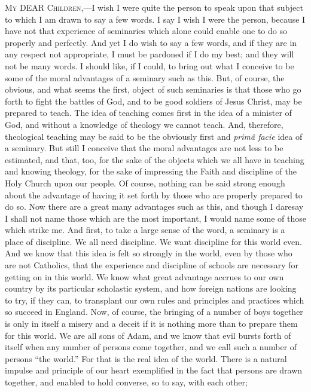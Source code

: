 M\textsc{y}
DEAR C\textsc{hildren},—I wish I
were quite the person to speak upon that subject to which I am drawn
to say a few words. I say I wish I were the person, because I have not
that experience of seminaries which alone could enable one to do so
properly and perfectly. And yet I do wish to say a few words, and if
they are in any respect not appropriate, I must be pardoned if I do my
best; and they will not be many words. I should like, if I could, to
bring out what I conceive to be some of the moral advantages of a
seminary such as this. But, of course, the obvious, and what seems the
first, object of such seminaries is that those who go forth to fight
the battles of God, and to be good soldiers of Jesus Christ, may be
prepared to teach. The idea of teaching comes first in the idea of a
minister of God, and without a knowledge of theology we cannot teach.
And, therefore, theological teaching may be said to be the obviously
first and \emph{primâ facie} idea of a seminary. But still I conceive
that the moral advantages are not less to be estimated, and that, too,
for the sake of the objects which we all have in teaching and knowing
theology, for the sake of impressing the Faith and discipline of the
Holy Church upon our people. Of course, nothing can be said strong
enough about the advantage of having it set forth by those who are
properly prepared to do so. Now there are a great many advantages such
as this, and though I daresay I shall not name those which are the
most important, I would name some of those which strike me. And first,
to take a large sense of the word, a seminary is a place of
discipline. We all need discipline. We want discipline for this world
even. And we know that this idea is felt so strongly in the world,
even by those who are not Catholics, that the experience and
discipline of schools are necessary for getting on in this world. We
know what great advantage accrues to our own country by its particular
scholastic system, and how foreign nations are looking to try, if they
can, to transplant our own rules and principles and practices which so
succeed in England. Now, of course, the bringing of a number of boys
together is only in itself a misery and a deceit if it is nothing more
than to prepare them for this world. We are all sons of Adam, and we
know that evil bursts forth of itself when any number of persons
come together, and we call such a number of persons ``the world.'' For
that is the real idea of the world. There is a natural impulse and
principle of our heart exemplified in the fact that persons are drawn
together, and enabled to hold converse, so to say, with each other;
